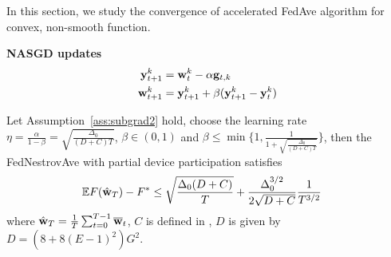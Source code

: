 
In this section, we study the convergence of accelerated FedAve 
algorithm for convex, non-smooth function.

\textbf{NASGD updates}
\begin{align}
	{\mathbf{y}}^k_{t+1} &= {\mathbf{w}}^k_{t} - \alpha  {\mathbf{g}}_{t,k}	\\
	{\mathbf{w}}^k_{t+1} & = {\mathbf{y}}^k_{t+1} + \beta({\mathbf{y}}^k_{t+1} - {\mathbf{y}}^k_{t})
\end{align}

\begin{theorem}
	Let Assumption~\ref{ass:subgrad2} hold, choose the learning rate $\eta = \frac{\alpha}{1 - \beta} = \sqrt{\frac{\Delta_0}{(D+C)T}}$, $\beta \in (0, 1)$ and $\beta \leq \min\{1, \frac{1}{1 + \sqrt{\frac{\Delta_0}{(D+C)T}}}\}$, then the FedNestrovAve with partial device participation satisfies
	\begin{align}
		 \mathbb{E} F(\hat{{\mathbf{w}}}_T) - F^* &\leq \sqrt{\frac{\Delta_0(D + C)}{T}} + \frac{\Delta_0^{3/2}}{2\sqrt{D+C}}\frac{1}{T^{3/2}} 
	\end{align}
	where $\hat{{\mathbf{w}}}_T = \frac{1}{T}\sum_{t=0}^{T-1} {\overline{\mathbf{w}}}_t$, $C$ is defined in \eq{\ref{eq:partialsample}},
$D$ is given by $D = (8 + 8(E-1)^2)G^2$.
	\label{th:nasgcvxnonsmoth}
\end{theorem}

